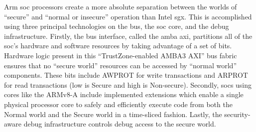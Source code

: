 Arm \gls{soc} processors create a more absolute separation between the worlds of “secure” and “normal or insecure” operation than Intel \gls{sgx}. This is accomplished using three principal technologies on the bus, the \gls{soc} core, and the debug infrastructure. Firstly, the bus interface, called the \gls{amba} \gls{axi}, partitions all of the \gls{soc}’s hardware and software resources by taking advantage of a set of bits. Hardware logic present in this “TrustZone-enabled AMBA3 AXI” bus fabric ensures that no “secure world” resources can be accessed by “normal world” components. These bits include AWPROT for write transactions and ARPROT for read transactions (low is Secure and high is Non-secure). Secondly, \gls{soc}s using cores like the ARMv8-A include implemented extensions which enable a single physical processor core to safely and efficiently execute code from both the Normal world and the Secure world in a time-sliced fashion. Lastly, the security-aware debug infrastructure controls debug access to the secure world\cite{ArmWhitepaper}.

